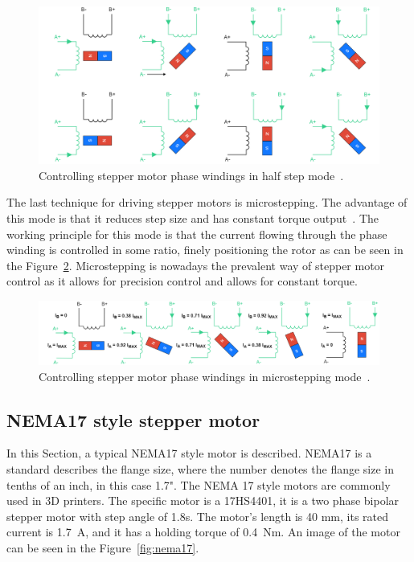 \begin{figure}[H]
    \centering
    \includegraphics[width=\textwidth]{obrazky/half_step_principle}
    \caption{Controlling stepper motor phase windings in half step mode~\cite{carmine_fiore_stepper_2021}.}
    \label{fig:stepper_half_step_mode}
\end{figure}

The last technique for driving stepper motors is microstepping.
The advantage of this mode is that it reduces step size and has constant torque output~\cite{carmine_fiore_stepper_2021}.
The working principle for this mode is that the current flowing through the phase winding is controlled in some ratio, finely positioning the rotor as can be seen in the Figure~\ref{fig:microstepping}.
Microstepping is nowadays the prevalent way of stepper motor control as it allows for precision control and allows for constant torque.

\begin{figure}[H]
    \centering
    \includegraphics[width=\textwidth]{obrazky/microstepping}
    \caption{Controlling stepper motor phase windings in microstepping mode~\cite{carmine_fiore_stepper_2021}.}
    \label{fig:microstepping}
\end{figure}

\subsection{NEMA17 style stepper motor}
\label{subsec:nema}
In this Section, a typical NEMA17 style motor is described.
NEMA17 is a standard describes the flange size, where the number denotes the flange size in tenths of an inch\cite{reprap_nema_nodate}, in this case 1.7".
The NEMA 17 style motors are commonly used in 3D printers.
The specific motor is a 17HS4401, it is a two phase bipolar stepper motor with step angle of 1.8\textdegree s.
The motor's length is 40 mm, its rated current is 1.7~A, and it has a holding torque of 0.4~Nm\cite{noauthor_nema_nodate}.
An image of the motor can be seen in the Figure~\ref{fig:nema17}.

